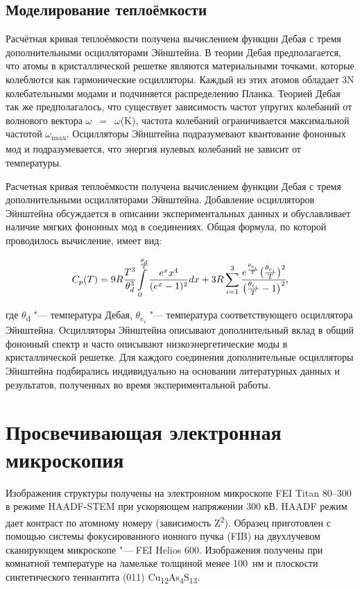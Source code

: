 \subsection{Моделирование теплоёмкости}\label{sect2_4_2}
Расчётная кривая теплоёмкости получена вычислением функции Дебая с тремя дополнительными осцилляторами Эйнштейна. В теории Дебая предполагается, что атомы в кристаллической решетке являются материальными точками, которые колеблются как гармонические осцилляторы.
Каждый из этих атомов обладает 3N колебательными модами и подчиняется распределению Планка.
Теорией Дебая так же предполагалось, что существует зависимость частот упругих колебаний от волнового вектора $\omega$~$=$~$\omega$(K), частота колебаний ограничивается максимальной частотой $\omega$\textsubscript{max}. Осцилляторы Эйнштейна подразумевают квантование фононных мод и подразумевается, что энергия нулевых колебаний не зависит от температуры.

Расчетная кривая теплоёмкости получена вычислением функции Дебая с тремя дополнительными осцилляторами Эйнштейна. Добавление осцилляторов Эйнштейна обсуждается в описании экспериментальных данных и обуславливает наличие мягких фононных мод в соединениях. Общая формула, по которой проводилось вычисление, имеет вид:

\begin{equation}
  \label{eq:equation2_4}
C_p(T)=9R\cfrac{T^3}{\theta_d^3}\int\limits_0^{\frac{\theta_d}{T}}\frac{e^xx^4}{(e^x-1)^2}dx+3R\sum_{i=1}^3\cfrac{e^{\frac{\theta_{e_i}}{T}}\big(\frac{\theta_{e_i}}{T}\big)^2}{\big(\frac{\theta_{e_i}}{T}-1\big)^2},
\end{equation}

где $\theta$\textsubscript{d} "--- температура Дебая, $\theta$\textsubscript{$e_i$} "--- температура соответствующего осциллятора Эйнштейна.
Осцилляторы Эйнштейна описывают дополнительный вклад в общий фононный спектр и часто описывают низкоэнергетические моды в кристаллической решетке.
Для каждого соединения дополнительные осцилляторы Эйнштейна подбирались индивидуально на основании  литературных данных и результатов, полученных во время экспериментальной работы.
\newpage
\section{Просвечивающая электронная микроскопия} \label{sect2_4}

Изображения структуры получены на электронном микроскопе FEI Titan 80--300 в режиме HAADF-STEM  при ускоряющем напряжении 300 кВ.
HAADF режим дает контраст по атомному номеру (зависимость Z\textsuperscript{2}).
Образец приготовлен с помощью системы фокусированного ионного пучка (FIB) на двухлучевом сканирующем микроскопе "--- FEI Helios 600.
Изображения получены при комнатной температуре на ламельке толщиной менее 100~нм и плоскости синтетического теннантита (011) Cu\textsubscript{12}As\textsubscript{4}S\textsubscript{13}.


